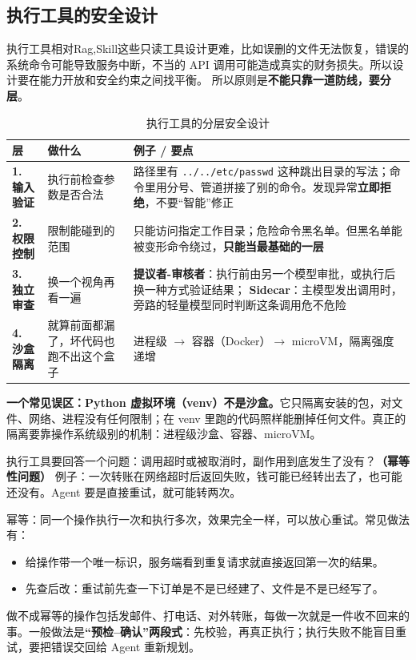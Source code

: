 \subsection{执行工具的安全设计}
执行工具相对Rag,Skill这些只读工具设计更难，比如误删的文件无法恢复，错误的系统命令可能导致服务中断，不当的 API 调用可能造成真实的财务损失。所以设计要在能力开放和安全约束之间找平衡。
所以原则是\textbf{不能只靠一道防线，要分层}。
\begin{table}[H]
\centering
\caption{执行工具的分层安全设计}
\label{tab:exec-safety}
\begin{tabular}{p{2.4cm} p{4.0cm} p{8.2cm}}
  \toprule
  层 & 做什么 & 例子 / 要点 \\
  \midrule
  \textbf{1. 输入验证} & 执行前检查参数是否合法 &
    路径里有 \texttt{../../etc/passwd} 这种跳出目录的写法；命令里用分号、管道拼接了别的命令。发现异常\textbf{立即拒绝}，不要“智能”修正 \\
  \addlinespace
  \textbf{2. 权限控制} & 限制能碰到的范围 &
    只能访问指定工作目录；危险命令黑名单。但黑名单能被变形命令绕过，\textbf{只能当最基础的一层} \\
  \addlinespace
  \textbf{3. 独立审查} & 换一个视角再看一遍 &
    \textbf{提议者-审核者}：执行前由另一个模型审批，或执行后换一种方式验证结果；\newline
    \textbf{Sidecar}：主模型发出调用时，旁路的轻量模型同时判断这条调用危不危险 \\
  \addlinespace
  \textbf{4. 沙盒隔离} & 就算前面都漏了，坏代码也跑不出这个盒子 &
    进程级 $\rightarrow$ 容器（Docker）$\rightarrow$ microVM，隔离强度递增 \\
  \bottomrule
\end{tabular}
\end{table}
\textbf{一个常见误区：Python 虚拟环境（venv）不是沙盒。}它只隔离安装的包，对文件、网络、进程没有任何限制；在 venv 里跑的代码照样能删掉任何文件。真正的隔离要靠操作系统级别的机制：进程级沙盒、容器、microVM。

执行工具要回答一个问题：调用超时或被取消时，副作用到底发生了没有？\textbf{（幂等性问题）}
例子：一次转账在网络超时后返回失败，钱可能已经转出去了，也可能还没有。Agent 要是直接重试，就可能转两次。

幂等：同一个操作执行一次和执行多次，效果完全一样，可以放心重试。常见做法有：
\begin{itemize}
  \item 给操作带一个唯一标识，服务端看到重复请求就直接返回第一次的结果。
  \item 先查后改：重试前先查一下订单是不是已经建了、文件是不是已经写了。
\end{itemize}
做不成幂等的操作包括发邮件、打电话、对外转账，每做一次就是一件收不回来的事。一般做法是\textbf{“预检--确认”两段式}：先校验，再真正执行；执行失败不能盲目重试，要把错误交回给 Agent 重新规划。
